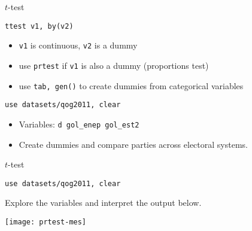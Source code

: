 \documentclass[t]{beamer}
\begin{document}

	\begin{frame}[t]{$t$-test}
		
		\begin{block}{\texttt{ttest v1, by(v2)}}

			\begin{itemize}
				\item \texttt{v1} is continuous, \texttt{v2} is a dummy
				\item use \texttt{prtest} if \texttt{v1} is also a dummy (proportions test)
				\item use \texttt{tab, gen()} to create dummies from categorical variables
			\end{itemize}

		\end{block}

        \begin{exampleblock}{\texttt{use datasets/qog2011, clear}}
			
			\begin{itemize}
				\item Variables: \texttt{d gol\_enep gol\_est2}
				\item Create dummies and compare parties across electoral systems.
			\end{itemize}
			
        \end{exampleblock}
	
	\end{frame}

	
	\begin{frame}[t]{$t$-test}

		
		\begin{exampleblock}{\texttt{use datasets/qog2011, clear}}
			
			Explore the variables and interpret the output below.
						
        \end{exampleblock}

		\begin{center}
			\texttt{[image: prtest-mes]}
		\end{center}
        
	\end{frame}
\end{document}
